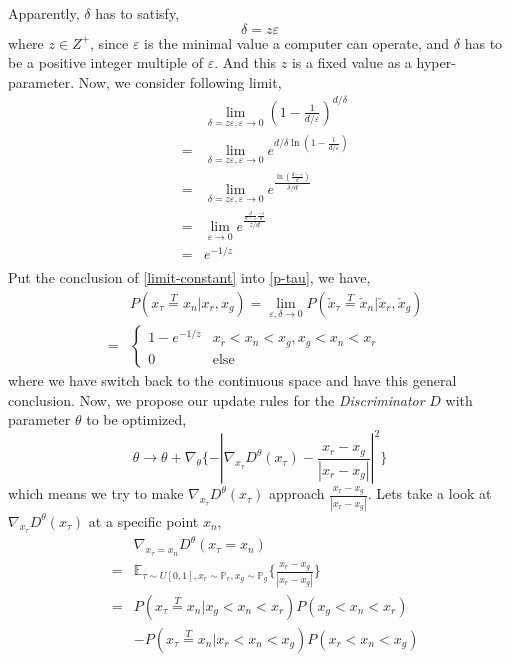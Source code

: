 \documentclass[letterpaper]{article} %
\begin{document}
Apparently, $\delta$ has to satisfy,
\begin{equation}\label{deltal-satisfy}
  \delta = z \varepsilon
\end{equation}
where $z \in Z^{+}$, since $\varepsilon$ is the minimal value a computer can operate, and $\delta$ has to be a positive integer multiple of $\varepsilon$.
And this $z$ is a fixed value as a hyper-parameter.
Now, we consider following limit,
\begin{eqnarray}\label{limit-constant}
    && \lim_{\delta=z\varepsilon,\varepsilon\rightarrow 0} (1-\frac{1}{d/\varepsilon})^{d/\delta} \nonumber\\
    \nonumber &=& \lim_{\delta=z\varepsilon,\varepsilon\rightarrow 0} e^{d/\delta \ln(1-\frac{1}{d/\varepsilon})} \\
    \nonumber &=& \lim_{\delta=z\varepsilon,\varepsilon\rightarrow 0} e^{\frac{\ln(\frac{d-\varepsilon}{d})}{\delta/d}} \\
    \nonumber &=& \lim_{\varepsilon\rightarrow0} e^{\frac{\frac{d}{d-\varepsilon}\frac{-1}{d}}{z/d}} \\
    \nonumber &=& e^{-1/z} \\
\end{eqnarray}
Put the conclusion of \eqref{limit-constant} into \eqref{p-tau}, we have,
\begin{eqnarray}\label{final-p-inter}
    && P(x_\tau\overset{T}{=}x_n|x_r,x_g) = \lim_{\varepsilon,\delta\rightarrow0} P(\check{x}_\tau\overset{T}{=}\check{x}_n|\check{x}_r,\check{x}_g) \nonumber\\
    &=&
    \begin{cases}
        1 - e^{-1/z} &\mbox{$x_r<x_n<x_g,x_g<x_n<x_r$}\\
        0 &\mbox{else}
    \end{cases}
\end{eqnarray}
where we have switch back to the continuous space and have this general conclusion.
Now, we propose our update rules for the \textit{Discriminator} $D$ with parameter $\theta$ to be optimized,
\begin{equation}\label{d-loss}
  \theta \longrightarrow \theta + \nabla_{\theta} \{ - |\nabla_{x_{\tau}}D^{\theta}(x_{\tau})-\frac{x_{r}-x_{g}}{|x_{r}-x_{g}|}|^2 \}
\end{equation}
which means we try to make $\nabla_{x_{\tau}}D^{\theta}(x_{\tau})$ approach $\frac{x_{r}-x_{g}}{|x_{r}-x_{g}|}$. Lets take a look at $\nabla_{x_{\tau}}D^{\theta}(x_{\tau})$ at a specific point $x_n$,
\begin{eqnarray}\label{d-at-xn}
    && \nabla_{x_{\tau}=x_n} D^{\theta}(x_{\tau}=x_n) \nonumber\\
    &=& \mathbb{E}_{\tau \sim U[0,1], x_r\sim\mathbb{P}_r,x_g\sim\mathbb{P}_g} \{\frac{x_{r}-x_{g}}{|x_{r}-x_{g}|}\} \nonumber\\
    &=& P(x_\tau\overset{T}{=}x_n|x_g<x_n<x_r) P(x_g<x_n<x_r) \nonumber\\
    && - P(x_\tau\overset{T}{=}x_n|x_r<x_n<x_g) P(x_r<x_n<x_g) \nonumber\\
\end{eqnarray}
\end{document}
